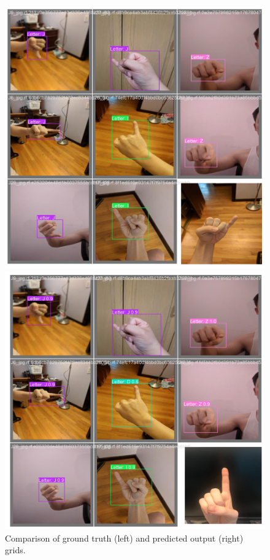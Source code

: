 \documentclass[a4paper]{article}
\begin{document}
\begin{figure}[h!]
    \centering
    \begin{minipage}[b]{0.45\textwidth}
        \centering
        \includegraphics[width=\textwidth]{./images/test_labels.png}
    \end{minipage}
    \hfill
    \begin{minipage}[b]{0.45\textwidth}
        \centering
        \includegraphics[width=\textwidth]{./images/test_predicts.png}
    \end{minipage}
    \caption{Comparison of ground truth (left) and predicted output (right) grids.}
    \label{fig:error_analysis}
\end{figure}
\end{document}
